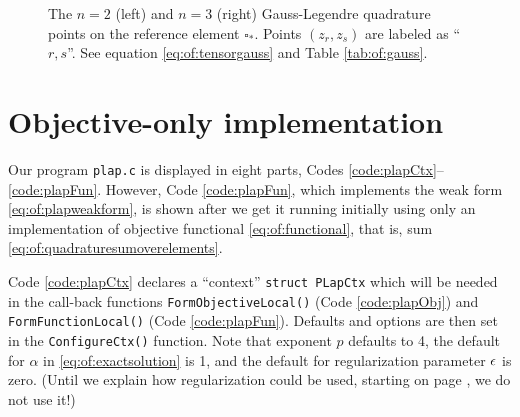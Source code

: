 \newcommand{\gausssanspts}{
  \draw[->,very thin] (-1.2,0.0) -- (1.2,0.0) node[below] {\small $\xi$};
  \draw[->,very thin] (0.0,-1.2) -- (0.0,1.2) node[left] {\small $\eta$};
  \draw[line width=1.5pt] (1.0,1.0) -- (-1.0,1.0) -- (-1.0,-1.0) -- (1.0,-1.0) -- cycle;
}

\begin{figure}
\qquad\qquad
{}
\caption{The $n=2$ (left) and $n=3$ (right) Gauss-Legendre quadrature points on the reference element $\square_\ast$.  Points $(z_r,z_s)$ are labeled as ``$r,s$''.  See equation \eqref{eq:of:tensorgauss} and Table \ref{tab:of:gauss}.}
\label{fig:of:gausstwod}
\end{figure}


\section{Objective-only implementation}

Our program \texttt{plap.c} is displayed in eight parts, Codes \ref{code:plapCtx}--\ref{code:plapFun}.  However, Code \ref{code:plapFun}, which implements the weak form \eqref{eq:of:plapweakform}, is shown after we get it running initially using only an implementation of objective functional \eqref{eq:of:functional}, that is, sum \eqref{eq:of:quadraturesumoverelements}.


Code \ref{code:plapCtx} declares a ``context'' \texttt{struct PLapCtx} which will be needed in the call-back functions \texttt{FormObjectiveLocal()} (Code \ref{code:plapObj}) and \texttt{FormFunctionLocal()} (Code \ref{code:plapFun}).  Defaults and \PETSc options are then set in the \texttt{ConfigureCtx()} function.  Note that exponent $p$ defaults to 4, the default for $\alpha$ in \eqref{eq:of:exactsolution} is 1, and the default for regularization parameter $\epsilon$ is zero.  (Until we explain how regularization could be used, starting on page \pageref{page:of:condellip}, we do not use it!)

